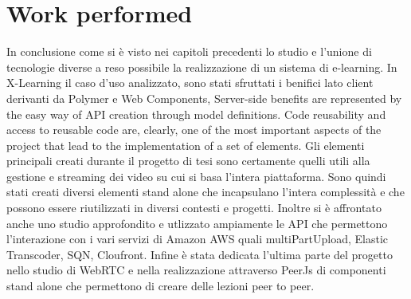 \section{Work performed}
\label{sec:work_performed}
 
In conclusione come si è visto nei capitoli precedenti lo studio e l'unione di tecnologie diverse a reso possibile la realizzazione di un sistema di e-learning.
In X-Learning il caso d'uso analizzato, sono stati sfruttati i benifici lato client derivanti da Polymer e Web Components, Server-side benefits are represented by the easy way of API creation through model definitions.
Code reusability and access to reusable code are, clearly, one of the most important aspects of the project that lead to the implementation of a set of elements.
Gli elementi principali creati durante il progetto di tesi sono certamente quelli utili alla gestione e streaming dei video su cui si basa l'intera piattaforma.
Sono quindi stati creati diversi elementi stand alone che incapsulano l'intera complessità e che possono essere riutilizzati in diversi contesti e progetti.
Inoltre si è affrontato anche uno studio approfondito e utlizzato ampiamente le API che permettono l'interazione con i vari servizi di Amazon AWS quali multiPartUpload, Elastic Transcoder, SQN, Cloufront.
Infine è stata dedicata l'ultima parte del progetto nello studio di WebRTC e nella realizzazione attraverso PeerJs di componenti stand alone che permettono di creare delle lezioni peer to peer.